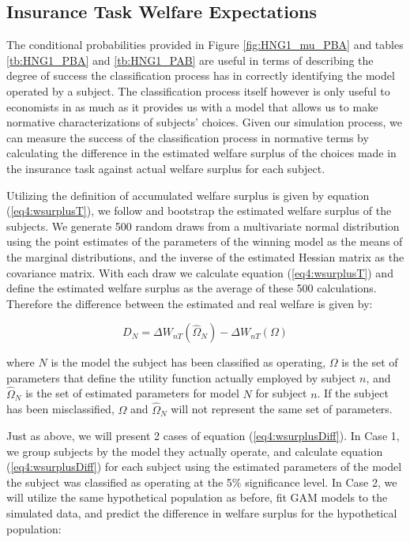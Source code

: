 \documentclass[../main.tex]{subfiles}
\begin{document}
\subsection{\texorpdfstring{\textcite{Harrison2016}}{Harrison and Ng (2016)} Insurance Task Welfare Expectations}
\label{sec4:WT}

The conditional probabilities provided in Figure \ref{fig:HNG1_mu_PBA} and tables \ref{tb:HNG1_PBA} and \ref{tb:HNG1_PAB} are useful in terms of describing the degree of success the classification process has in correctly identifying the model operated by a subject.
The classification process itself however is only useful to economists in as much as it provides us with a model that allows us to make normative characterizations of subjects' choices.
Given our simulation process, we can measure the success of the classification process in normative terms by calculating the difference in the estimated welfare surplus of the choices made in the \textcite{Harrison2016} insurance task against actual welfare surplus for each subject.

Utilizing the definition of accumulated welfare surplus is given by equation (\ref{eq4:wsurplusT}), we follow \textcite[110-111]{Harrison2016} and bootstrap the estimated welfare surplus of the subjects.
We generate 500 random draws from a multivariate normal distribution using the point estimates of the parameters of the winning model as the means of the marginal distributions, and the inverse of the estimated Hessian matrix as the covariance matrix.
With each draw we calculate equation (\ref{eq4:wsurplusT}) and define the estimated welfare surplus as the average of these 500 calculations.
Therefore the difference between the estimated and real welfare is given by:

\begin{equation}
	\label{eq4:wsurplusDiff}
	D_N = \Delta W_{nT}(\hat{\Omega}_N) - \Delta W_{nT}(\Omega)
\end{equation}

\noindent where $N$ is the model the subject has been classified as operating, $\Omega$ is the set of parameters that define the utility function actually employed by subject $n$, and $\hat{\Omega}_N$ is the set of estimated parameters for model $N$ for subject $n$.
If the subject has been misclassified, $\Omega$ and $\hat{\Omega}_N$ will not represent the same set of parameters.

Just as above, we will present 2 cases of equation (\ref{eq4:wsurplusDiff}).
In Case 1, we group subjects by the model they actually operate, and calculate equation (\ref{eq4:wsurplusDiff}) for each subject using the estimated parameters of the model the subject was classified as operating at the 5\% significance level.
In Case 2, we will utilize the same hypothetical population as before, fit GAM models to the simulated data, and predict the difference in welfare surplus for the hypothetical population:
\end{document}
